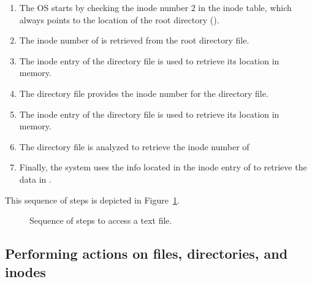\begin{enumerate}
\item The \acs{OS} starts by checking the inode number 2 in the inode table, which always points to the location of the root directory (\mycommand{/}).
\item The inode number of  is retrieved from the root directory file.
\item The  inode entry of the  directory file is used to retrieve its location in memory.
\item The  directory file provides the inode number for the  directory file.
\item The inode entry of the  directory file is used to retrieve its location in memory.
\item The  directory file is analyzed to retrieve the inode number of 
\item Finally, the system uses the info located in the inode entry of  to retrieve the data in .
\end{enumerate}

This sequence of steps is depicted in Figure~\ref{fig:ch6_accessing_file}.

\begin{figure}[!htbp]
  \centering
        
        \caption{Sequence of steps to access a text file.}
        \label{fig:ch6_accessing_file}
\end{figure}

\subsection{Performing actions on files, directories, and inodes}

